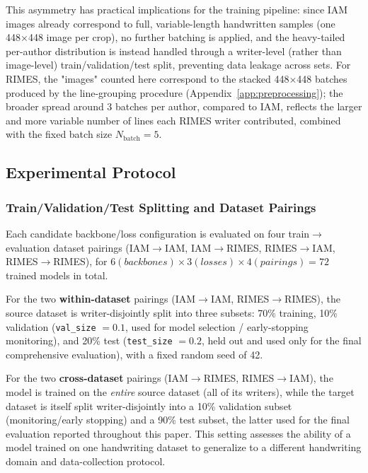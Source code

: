 This asymmetry has practical implications for the training pipeline: since IAM images already correspond to full, variable-length handwritten samples (one 448×448 image per crop), no further batching is applied, and the heavy-tailed per-author distribution is instead handled through a writer-level (rather than image-level) train/validation/test split, preventing data leakage across sets. For RIMES, the "images" counted here correspond to the stacked 448×448 batches produced by the line-grouping procedure (Appendix~\ref{app:preprocessing}); the broader spread around 3 batches per author, compared to IAM, reflects the larger and more variable number of lines each RIMES writer contributed, combined with the fixed batch size $N_{\text{batch}}=5$.

\subsection{Experimental Protocol}

\subsubsection{Train/Validation/Test Splitting and Dataset Pairings}
\label{subsubsec:dataset-pairings}

Each candidate backbone/loss configuration is evaluated on four
train$\to$evaluation dataset pairings (IAM$\to$IAM, IAM$\to$RIMES,
RIMES$\to$IAM, RIMES$\to$RIMES), for $6(backbones)\times3(losses)\times4(pairings)=72$ trained
models in total.

For the two \textbf{within-dataset} pairings (IAM$\to$IAM,
RIMES$\to$RIMES), the source dataset is writer-disjointly split into
three subsets: 70\% training, 10\% validation (\texttt{val\_size}
$=0.1$, used for model selection / early-stopping monitoring), and
20\% test (\texttt{test\_size} $=0.2$, held out and used only for the
final comprehensive evaluation), with a fixed random seed of 42.

For the two \textbf{cross-dataset} pairings (IAM$\to$RIMES,
RIMES$\to$IAM), the model is trained on the \emph{entire} source
dataset (all of its writers), while the target dataset is itself split
writer-disjointly into a 10\% validation subset (monitoring/early
stopping) and a 90\% test subset, the latter used for the final
evaluation reported throughout this paper. This setting assesses the
ability of a model trained on one handwriting dataset to generalize to
a different handwriting domain and data-collection protocol.

